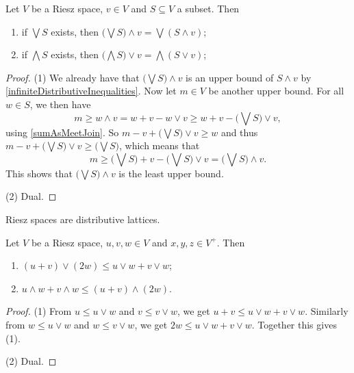 \begin{proposition} \label{distributivityRieszSpaces}
Let $V$ be a Riesz space, $v\in V$ and $S\subseteq V$ a subset. Then
\begin{enumerate}
\item if $\bigvee S$ exists, then $\big(\bigvee S\big) \wedge v = \bigvee (S\wedge v)$;
\item if $\bigwedge S$ exists, then $\big(\bigwedge S\big) \vee v = \bigwedge (S\vee v)$;
\end{enumerate}
\end{proposition}
\begin{proof}
(1) We already have that $\big(\bigvee S\big) \wedge v$ is an upper bound of $S\wedge v$ by \ref{infiniteDistributiveInequalities}. Now let $m\in V$ be another upper bound. For all $w\in S$, we then have
\[ m \geq w\wedge v = w+v - w\vee v \geq w+v - \big(\bigvee S\big)\vee v, \]
using \ref{sumAsMeetJoin}. So $m - v + \big(\bigvee S\big)\vee v \geq w$ and thus $m - v + \big(\bigvee S\big)\vee v \geq \big(\bigvee S\big)$, which means that
\[ m \geq \big(\bigvee S\big) + v - \big(\bigvee S\big)\vee v = \big(\bigvee S\big)\wedge v. \]
This shows that $\big(\bigvee S\big)\wedge v$ is the least upper bound.

(2) Dual.
\end{proof}
\begin{corollary}
Riesz spaces are distributive lattices.
\end{corollary}

\begin{lemma} \label{additionLatticeOperationsInequalities}
Let $V$ be a Riesz space, $u,v,w\in V$ and $x,y,z\in V^+$. Then
\begin{enumerate}
\item $(u+v)\vee (2w) \leq u\vee w + v\vee w$;
\item $u\wedge w + v\wedge w \leq (u+v)\wedge (2w)$.
\end{enumerate}
\end{lemma}
\begin{proof}
(1) From $u\leq u\vee w$ and $v\leq v\vee w$, we get $u+v \leq u\vee w + v\vee w$. Similarly from $w\leq u\vee w$ and $w\leq v\vee w$, we get $2w \leq u\vee w + v\vee w$. Together this gives (1).

(2) Dual.
\end{proof}


